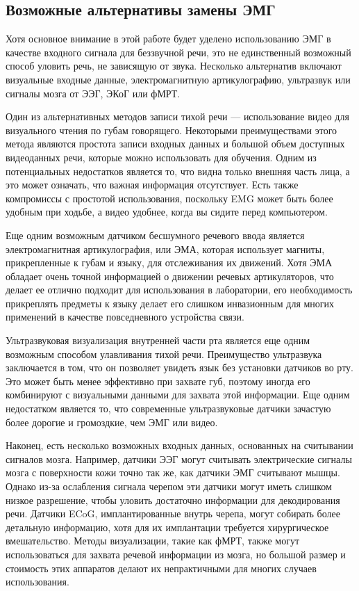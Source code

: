 \subsection{Возможные альтернативы замены ЭМГ}

Хотя основное внимание в этой работе будет уделено использованию ЭМГ в качестве входного сигнала для беззвучной речи, это не единственный возможный способ уловить речь, не зависящую от звука. Несколько альтернатив включают визуальные входные данные, электромагнитную артикулографию, ультразвук или сигналы мозга от ЭЭГ, ЭКоГ или фМРТ.

Один из альтернативных методов записи тихой речи — использование видео для визуального чтения по губам говорящего. Некоторыми преимуществами этого метода являются простота записи входных данных и большой объем доступных видеоданных речи, которые можно использовать для обучения. Одним из потенциальных недостатков является то, что видна только внешняя часть лица, а это может означать, что важная информация отсутствует. Есть также компромиссы с простотой использования, поскольку EMG может быть более удобным при ходьбе, а видео удобнее, когда вы сидите перед компьютером.

Еще одним возможным датчиком бесшумного речевого ввода является электромагнитная артикулография, или ЭМА, которая использует магниты, прикрепленные к губам и языку, для отслеживания их движений. Хотя ЭМА обладает очень точной информацией о движении речевых артикуляторов, что делает ее отлично подходит для использования в лаборатории, его необходимость прикреплять предметы к языку делает его слишком инвазионным для многих применений в качестве повседневного устройства связи.

Ультразвуковая визуализация внутренней части рта является еще одним возможным способом улавливания тихой речи. Преимущество ультразвука заключается в том, что он позволяет увидеть язык без установки датчиков во рту. Это может быть менее эффективно при захвате губ, поэтому иногда его комбинируют с визуальными данными для захвата этой информации. Еще одним недостатком является то, что современные ультразвуковые датчики зачастую более дорогие и громоздкие, чем ЭМГ или видео.

Наконец, есть несколько возможных входных данных, основанных на считывании сигналов мозга. Например, датчики ЭЭГ могут считывать электрические сигналы мозга с поверхности кожи точно так же, как датчики ЭМГ считывают мышцы. Однако из-за ослабления сигнала черепом эти датчики могут иметь слишком низкое разрешение, чтобы уловить достаточно информации для декодирования речи. Датчики ECoG, имплантированные внутрь черепа, могут собирать более детальную информацию, хотя для их имплантации требуется хирургическое вмешательство. Методы визуализации, такие как фМРТ, также могут использоваться для захвата речевой информации из мозга, но большой размер и стоимость этих аппаратов делают их непрактичными для многих случаев использования.
